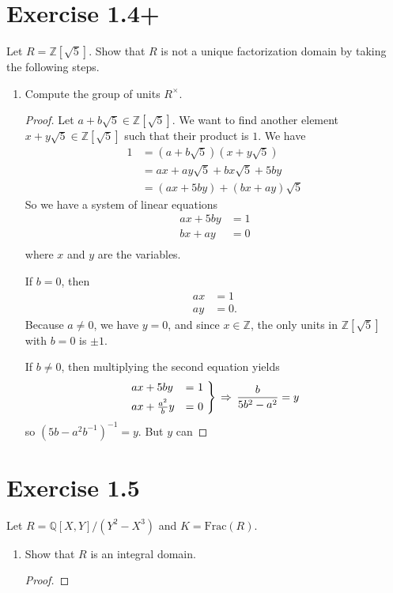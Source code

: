 \documentclass[a4paper]{article}
\begin{document}
\section*{Exercise 1.4+}
Let \(R = \mathbb{Z}[\sqrt{5}]\). Show that \(R\) is not a unique factorization domain by taking the following steps.
\begin{enumerate}
  \item Compute the group of units \(R^\times\).
  \begin{proof}
    Let \(a + b \sqrt{5} \in \mathbb{Z}[\sqrt{5}]\). We want to find another element \(x + y \sqrt{5} \in \mathbb{Z}[\sqrt{5}]\) such that their product is \(1\). We have
    \begin{align*}
      1 &= (a + b \sqrt{5}) (x + y \sqrt{5}) \\
      &= ax + ay\sqrt{5} + bx \sqrt{5} + 5 by \\
      &= (ax + 5by) + (bx + ay) \sqrt{5}
    \end{align*}
    So we have a system of linear equations
    \begin{align*}
      ax + 5 by &= 1 \\
      bx + ay &= 0 \\
    \end{align*}
    where \(x\) and \(y\) are the variables.

    If \(b = 0\), then
    \begin{align*}
      ax &= 1 \\
      ay &= 0 \text{.}
    \end{align*}
    Because \(a \neq 0\), we have \(y = 0\), and since \(x \in \mathbb{Z}\), the only units in \(\mathbb{Z}[\sqrt{5}]\) with \(b = 0\) is \(\pm 1\).

    If \(b \neq 0\), then multiplying the second equation yields
    \begin{align*}
      \begin{rcases*}
        ax + 5by &= 1 \\
        ax + \frac{a^2}{b}y &= 0
      \end{rcases*}
      \, \Rightarrow \, \frac{b}{5b^2 - a^2} = y
    \end{align*}
    so \((5b - a^2 b^{-1})^{-1} = y\). But \(y\) can 
  \end{proof}
\end{enumerate}
\newpage
\section*{Exercise 1.5}
Let \(R = \mathbb{Q}[X, Y]/(Y^2 - X^3)\) and \(K = \mathrm{Frac}(R)\).
\begin{enumerate}
  \item Show that \(R\) is an integral domain.
  \begin{proof}
    
  \end{proof}
\end{enumerate}
\end{document}
